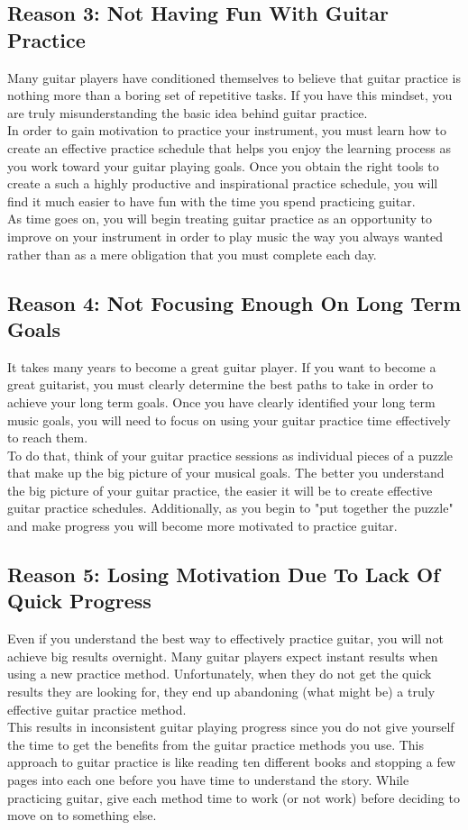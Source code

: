 \subsection*{Reason 3: Not Having Fun With Guitar Practice}
Many guitar players have conditioned themselves to believe that guitar practice is nothing more than a boring set of repetitive tasks. If you have this mindset, you are truly misunderstanding the basic idea behind guitar practice.\\
In order to gain motivation to practice your instrument, you must learn how to create an effective practice schedule that helps you enjoy the learning process as you work toward your guitar playing goals. Once you obtain the right tools to create a such a highly productive and inspirational practice schedule, you will find it much easier to have fun with the time you spend practicing guitar.\\
As time goes on, you will begin treating guitar practice as an opportunity to improve on your instrument in order to play music the way you always wanted rather than as a mere obligation that you must complete each day.\\
\subsection*{Reason 4: Not Focusing Enough On Long Term Goals}
It takes many years to become a great guitar player. If you want to become a great guitarist, you must clearly determine the best paths to take in order to achieve your long term goals. Once you have clearly identified your long term music goals, you will need to focus on using your guitar practice time effectively to reach them.\\
To do that, think of your guitar practice sessions as individual pieces of a puzzle that make up the big picture of your musical goals. The better you understand the big picture of your guitar practice, the easier it will be to create effective guitar practice schedules. Additionally, as you begin to "put together the puzzle" and make progress you will become more motivated to practice guitar.
\subsection*{Reason 5: Losing Motivation Due To Lack Of Quick Progress}
Even if you understand the best way to effectively practice guitar, you will not achieve big results overnight. Many guitar players expect instant results when using a new practice method. Unfortunately, when they do not get the quick results they are looking for, they end up abandoning (what might be) a truly effective guitar practice method.\\
This results in inconsistent guitar playing progress since you do not give yourself the time to get the benefits from the guitar practice methods you use. This approach to guitar practice is like reading ten different books and stopping a few pages into each one before you have time to understand the story. While practicing guitar, give each method time to work (or not work) before deciding to move on to something else.
